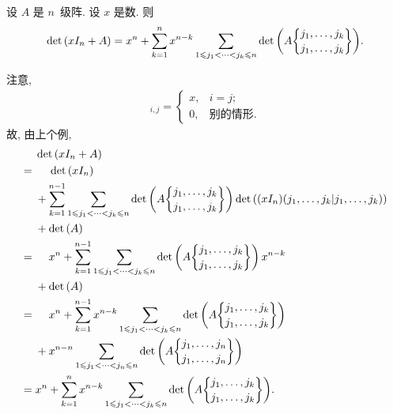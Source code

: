 \documentclass[../libro.tex]{subfiles}
\begin{document}
\begin{example}
    设 \(A\) 是 \(n\)~级阵.
    设 \(x\) 是数.
    则
    \begin{align*}
        \det {(xI_n + A)}
        =
        x^n
        + \sum_{k = 1}^{n}
        {x^{n-k}
            \sum_{1 \leq j_1 < \dots < j_k \leq n}
            \det {\left(
                    A\submat{j_1,\dots,j_k}{j_1,\dots,j_k}
            \right)}
        }.
    \end{align*}

    注意,
    \begin{align*}
        [xI_n]_{i,j} =
        \begin{cases}
            x, & i = j;       \\
            0, & \text{别的情形}.
        \end{cases}
    \end{align*}
    故, 由上个例,
    \begin{align*}
        &
        \det {(xI_n + A)}
        \\
        = {} &
        \hphantom{{} + {}}
        \det {(xI_n)}
        \\
        &
        + \sum_{k = 1}^{n-1}
        {
            \sum_{1 \leq j_1 < \dots < j_k \leq n}
            \det {\left(
                    A\submat{j_1,\dots,j_k}{j_1,\dots,j_k}
            \right)}
            \det {((xI_n)({j_1,\dots,j_k}|{j_1,\dots,j_k}))}
        }
        \\
        &
        + \det {(A)}
        \\
        = {} &
        \hphantom{{} + {}}
        x^n
        + \sum_{k = 1}^{n-1}
        {
            \sum_{1 \leq j_1 < \dots < j_k \leq n}
            \det {\left(
                    A\submat{j_1,\dots,j_k}{j_1,\dots,j_k}
            \right)}
            \,
            x^{n-k}
        }
        \\
        &
        + \det {(A)}
        \\
        = {} &
        \hphantom{{} + {}}
        x^n
        + \sum_{k = 1}^{n-1}
        {
            x^{n-k}
            \sum_{1 \leq j_1 < \dots < j_k \leq n}
            \det {\left(
                    A\submat{j_1,\dots,j_k}{j_1,\dots,j_k}
            \right)}
        }
        \\
        &
        + x^{n-n}
        \sum_{1 \leq j_1 < \dots < j_n \leq n}
        \det {\left(
                A\submat{j_1,\dots,j_n}{j_1,\dots,j_n}
        \right)}
        \\
        = {} &
        x^n
        + \sum_{k = 1}^{n}
        {x^{n-k}
            \sum_{1 \leq j_1 < \dots < j_k \leq n}
            \det {\left(
                    A\submat{j_1,\dots,j_k}{j_1,\dots,j_k}
            \right)}
        }.
        \qefhere
    \end{align*}
\end{example}
\end{document}
